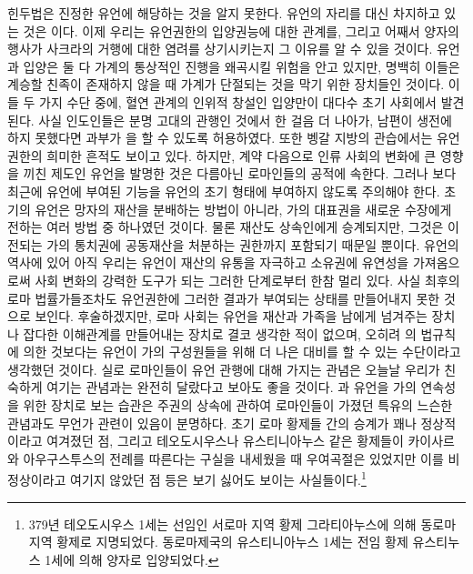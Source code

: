 힌두법은 진정한 유언에 해당하는 것을 알지 못한다.
유언의 자리를 대신 차지하고 있는 것은 이다.
이제 우리는 유언권한의 입양권능에 대한 관계를,
그리고 어째서 양자의 행사가 사크라의 거행에 대한 염려를 상기시키는지 그 이유를
알 수 있을 것이다.
유언과 입양은 둘 다 가계의 통상적인 진행을 왜곡시킬
위험을 안고 있지만, 명백히 이들은
계승할 친족이 존재하지 않을 때 가계가 단절되는 것을 막기 위한
장치들인 것이다.
이들 두 가지 수단 중에,
혈연 관계의 인위적 창설인
입양만이
대다수 초기 사회에서 발견된다.
사실 인도인들은 분명 고대의 관행인 것에서 한 걸음 더 나아가,
남편이 생전에 하지 못했다면 과부가 을 할 수 있도록 허용하였다.
또한 벵갈 지방의 관습에서는 유언권한의 희미한 흔적도 보이고 있다.
하지만,
계약 다음으로 인류 사회의 변화에 큰 영향을 끼친 제도인
유언을 발명한 것은 다름아닌 로마인들의 공적에 속한다.
그러나
보다 최근에 유언에 부여된 기능을
유언의 초기 형태에 부여하지 않도록 주의해야 한다.
초기의 유언은 망자의 재산을 분배하는 방법이 아니라,
가의 대표권을 새로운 수장에게 전하는 여러 방법 중 하나였던 것이다.
물론 재산도 상속인에게 승계되지만,
그것은 이전되는 가의 통치권에
공동재산을 처분하는 권한까지 포함되기 때문일 뿐이다.
유언의 역사에 있어
아직 우리는
유언이
재산의 유통을 자극하고
소유권에 유연성을 가져옴으로써
사회 변화의
강력한 도구가 되는 그러한 단계로부터 한참 멀리 있다.
사실 최후의 로마 법률가들조차도
유언권한에 그러한 결과가 부여되는 상태를 만들어내지 못한 것으로 보인다.
후술하겠지만,
로마 사회는 유언을
재산과 가족을 남에게 넘겨주는 장치나
잡다한 이해관계를 만들어내는 장치로
결코 생각한 적이 없으며, 오히려
의 법규칙에 의한 것보다는 유언이
가의 구성원들을 위해 더 나은 대비를 할 수 있는 수단이라고
생각했던 것이다.
실로 로마인들이 유언 관행에 대해 가지는 관념은
오늘날 우리가 친숙하게 여기는 관념과는 완전히 달랐다고 보아도 좋을 것이다.
과 유언을 가의 연속성을 위한 장치로 보는 습관은
주권의 상속에 관하여 로마인들이 가졌던 특유의 느슨한 관념과도
무언가 관련이 있음이 분명하다.
초기 로마 황제들 간의 승계가 꽤나 정상적이라고 여겨졌던 점,
그리고 테오도시우스나
유스티니아누스 같은 황제들이 카이사르와 아우구스투스의 전례를
따른다는 구실을 내세웠을 때
우여곡절은 있었지만
이를 비정상이라고 여기지 않았던 점 등은
보기 싫어도 보이는 사실들이다.\footnote{%
  379년 테오도시우스 1세는 선임인 서로마 지역 황제 그라티아누스에 의해
  동로마 지역 황제로 지명되었다.
  동로마제국의 유스티니아누스 1세는 전임 황제 유스티누스 1세에 의해
  양자로 입양되었다.}

